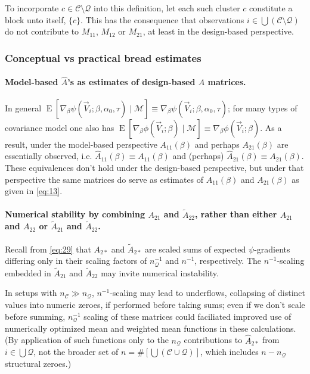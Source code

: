 \documentclass{article}
\newcommand{\EE}{\operatorname{E}}
\begin{document}
To incorporate $c\in \mathcal{C}\setminus\mathcal{Q}$ into this
definition, let each such cluster $c$ constitute a block unto itself,
$\{c\}$. This has the consequence that observations $i
\in \bigcup\left(\mathcal{C}\setminus\mathcal{Q}\right)$ do not
contribute to $M_{11}$, $M_{12}$ or $M_{21}$, at least in the
design-based perspective.

  \subsubsection{Conceptual vs practical bread estimates} \label{sec:conc-vs-pract}
  \paragraph{Model-based $\hat{A}$'s as estimates of design-based $A$ matrices.}%
In general $\EE
[\nabla_{\beta}\psi(\vec{V}_{i};  \beta, \alpha_{0},\tau ) \mid \mathcal{M}] \equiv
\nabla_{\beta}\psi(\vec{V}_{i};  \beta, \alpha_{0}, \tau )$; for many types of
covariance model one also has $\EE
[\nabla_{\beta}\phi(\vec{V}_{i};  \beta ) \mid \mathcal{M}] \equiv
\nabla_{\beta}\phi(\vec{V}_{i};  \beta )$. As a result, under the
model-based perspective
$A_{11}(\beta)$ and perhaps $A_{21}(\beta)$ are essentially observed,
i.e.  $\hat{A}_{11}(\beta) \equiv A_{11}(\beta)$ and (perhaps)
$\hat{A}_{21}(\beta) \equiv A_{21}(\beta)$.   These equivalences don't
hold under the design-based perspective, but under that perspective
the same matrices do serve as estimates of $A_{11}(\beta)$ and
$A_{21}(\beta)$ as given in \eqref{eq:13}.

\paragraph{Numerical stability by combining ${A}_{21}$ and
  $\tilde{A}_{22}$, rather than either
  ${A}_{21}$ and ${A}_{22}$ or $\tilde{A}_{21}$ and $\tilde{A}_{22}$.}
Recall from \eqref{eq:29} that $A_{2*}$ and $\tilde{A}_{2*}$ are
scaled sums of expected $\psi$-gradients differing only in their
scaling factors of $n_{\mathcal{Q}}^{-1}$ and $n^{-1}$,
respectively. The $n^{-1}$-scaling embedded
in $\tilde{A}_{21}$ and $\tilde{A}_{22}$ may invite numerical
instability.

  In setups with
  $n_{\mathcal{C}} \gg n_{\mathcal{Q}}$, $n^{-1}$-scaling may lead to underflows,
  collapsing of distinct values into numeric zeroes, if performed
  before taking sums; even if we don't scale before summing,
  $n_{\mathcal{Q}}^{-1}$ scaling of these matrices could faciliated improved
  use of numerically optimized mean and weighted mean functions in
  these calculations.  (By application of such functions only to the
  $n_{\mathcal{Q}}$ contributions to $\hat{A}_{2*}$  from $i \in \bigcup \mathcal{Q}$, not the broader set of $n = \#\left[\bigcup (\mathcal{C}\cup
    \mathcal{Q}) \right]$, which includes $n - n_{\mathcal{Q}}$ structural
  zeroes.)
\end{document}
